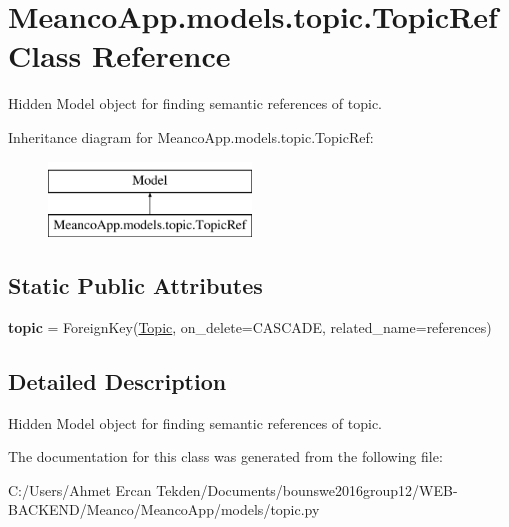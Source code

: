 \hypertarget{class_meanco_app_1_1models_1_1topic_1_1_topic_ref}{}\section{Meanco\+App.\+models.\+topic.\+Topic\+Ref Class Reference}
\label{class_meanco_app_1_1models_1_1topic_1_1_topic_ref}


Hidden Model object for finding semantic references of topic.  


Inheritance diagram for Meanco\+App.\+models.\+topic.\+Topic\+Ref\+:\begin{figure}[H]
\begin{center}
\leavevmode
\includegraphics[height=2.000000cm]{class_meanco_app_1_1models_1_1topic_1_1_topic_ref}
\end{center}
\end{figure}
\subsection*{Static Public Attributes}
\begin{DoxyCompactItemize}
\item 
\hypertarget{class_meanco_app_1_1models_1_1topic_1_1_topic_ref_a4bfa4e5b560dd1d981a2030ba25c4321}{}\label{class_meanco_app_1_1models_1_1topic_1_1_topic_ref_a4bfa4e5b560dd1d981a2030ba25c4321} 
{\bfseries topic} = Foreign\+Key(\hyperlink{class_meanco_app_1_1models_1_1topic_1_1_topic}{Topic}, on\+\_\+delete=C\+A\+S\+C\+A\+DE, related\+\_\+name=\textquotesingle{}references\textquotesingle{})
\end{DoxyCompactItemize}


\subsection{Detailed Description}
Hidden Model object for finding semantic references of topic. 



The documentation for this class was generated from the following file\+:\begin{DoxyCompactItemize}
\item 
C\+:/\+Users/\+Ahmet Ercan Tekden/\+Documents/bounswe2016group12/\+W\+E\+B-\/\+B\+A\+C\+K\+E\+N\+D/\+Meanco/\+Meanco\+App/models/topic.\+py\end{DoxyCompactItemize}
